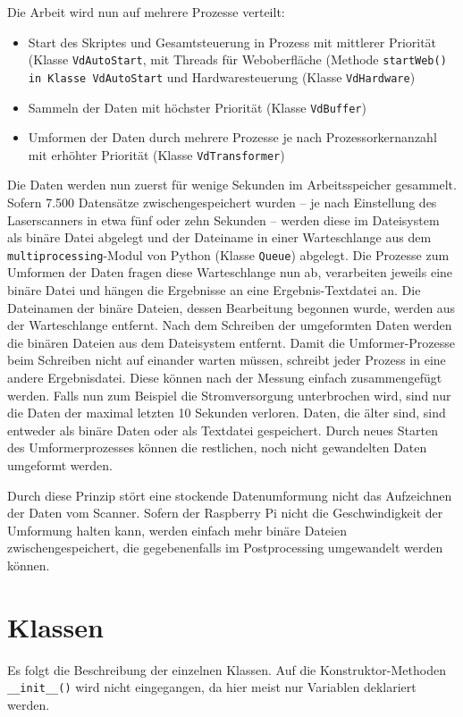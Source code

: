\documentclass[a4paper,12pt,bibliography=totoc, listof=totoc,titlepage,pointlessnumbers]{scrreprt}
\newcommand{\code}[1]{\texttt{#1}}
\begin{document}
Die Arbeit wird nun auf mehrere Prozesse verteilt:
\begin{itemize}
 \item Start des Skriptes und Gesamtsteuerung in Prozess mit mittlerer Priorität (Klasse \code{VdAutoStart}, mit Threads für Weboberfläche (Methode \code{startWeb() in Klasse \code{VdAutoStart}} und Hardwaresteuerung (Klasse \code{VdHardware})
 \item Sammeln der Daten mit höchster Priorität (Klasse \code{VdBuffer})
 \item Umformen der Daten durch mehrere Prozesse je nach Prozessorkernanzahl mit erhöhter Priorität (Klasse \code{VdTransformer})
\end{itemize}

Die Daten werden nun zuerst für wenige Sekunden im Arbeitsspeicher gesammelt. Sofern 7.500 Datensätze zwischengespeichert wurden -- je nach Einstellung des Laserscanners in etwa fünf oder zehn Sekunden -- werden diese im Dateisystem als binäre Datei abgelegt und der Dateiname in einer Warteschlange aus dem \code{multiprocessing}-Modul von Python (Klasse \code{Queue}) abgelegt. Die Prozesse zum Umformen der Daten fragen diese Warteschlange nun ab, verarbeiten jeweils eine binäre Datei und hängen die Ergebnisse an eine Ergebnis-Textdatei an. Die Dateinamen der binäre Dateien, dessen Bearbeitung begonnen wurde, werden aus der Warteschlange entfernt. Nach dem Schreiben der umgeformten Daten werden die binären Dateien aus dem Dateisystem entfernt. Damit die Umformer-Prozesse beim Schreiben nicht auf einander warten müssen, schreibt jeder Prozess in eine andere Ergebnisdatei. Diese können nach der Messung einfach zusammengefügt werden. Falls nun zum Beispiel die Stromversorgung unterbrochen wird, sind nur die Daten der maximal letzten 10 Sekunden verloren. Daten, die älter sind, sind entweder als binäre Daten oder als Textdatei gespeichert. Durch neues Starten des Umformerprozesses können die restlichen, noch nicht gewandelten Daten umgeformt werden.

Durch diese Prinzip stört eine stockende Datenumformung nicht das Aufzeichnen der Daten vom Scanner. Sofern der Raspberry Pi nicht die Geschwindigkeit der Umformung halten kann, werden einfach mehr binäre Dateien zwischengespeichert, die gegebenenfalls im Postprocessing umgewandelt werden können.

\section{Klassen}
Es folgt die Beschreibung der einzelnen Klassen. Auf die Konstruktor-Methoden \code{\_\_init\_\_()} wird nicht eingegangen, da hier meist nur Variablen deklariert werden.
\end{document}

